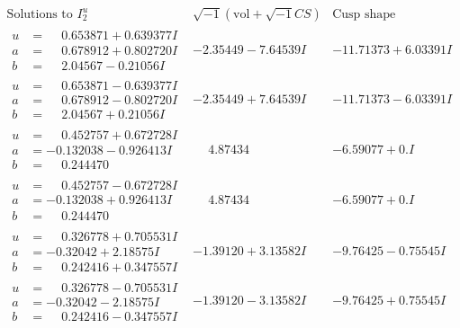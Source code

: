 \documentclass[1p]{elsarticle_modified}
\theoremstyle{definition}
\newcommand{\I}{\sqrt{-1}}
\begin{document}
$$\begin{array}{c|c|c}  
\text{Solutions to }I^u_{2}& \I (\text{vol} + \sqrt{-1}CS) & \text{Cusp shape}\\
 \hline 
\begin{aligned}
u &= \phantom{-}0.653871 + 0.639377 I \\
a &= \phantom{-}0.678912 + 0.802720 I \\
b &= \phantom{-}2.04567 - 0.21056 I\end{aligned}
 & -2.35449 - 7.64539 I & -11.71373 + 6.03391 I \\ \hline\begin{aligned}
u &= \phantom{-}0.653871 - 0.639377 I \\
a &= \phantom{-}0.678912 - 0.802720 I \\
b &= \phantom{-}2.04567 + 0.21056 I\end{aligned}
 & -2.35449 + 7.64539 I & -11.71373 - 6.03391 I \\ \hline\begin{aligned}
u &= \phantom{-}0.452757 + 0.672728 I \\
a &= -0.132038 - 0.926413 I \\
b &= \phantom{-}0.244470\phantom{ +0.000000I}\end{aligned}
 & \phantom{-}4.87434\phantom{ +0.000000I} & -6.59077 + 0. I\phantom{ +0.000000I} \\ \hline\begin{aligned}
u &= \phantom{-}0.452757 - 0.672728 I \\
a &= -0.132038 + 0.926413 I \\
b &= \phantom{-}0.244470\phantom{ +0.000000I}\end{aligned}
 & \phantom{-}4.87434\phantom{ +0.000000I} & -6.59077 + 0. I\phantom{ +0.000000I} \\ \hline\begin{aligned}
u &= \phantom{-}0.326778 + 0.705531 I \\
a &= -0.32042 + 2.18575 I \\
b &= \phantom{-}0.242416 + 0.347557 I\end{aligned}
 & -1.39120 + 3.13582 I & -9.76425 - 0.75545 I \\ \hline\begin{aligned}
u &= \phantom{-}0.326778 - 0.705531 I \\
a &= -0.32042 - 2.18575 I \\
b &= \phantom{-}0.242416 - 0.347557 I\end{aligned}
 & -1.39120 - 3.13582 I & -9.76425 + 0.75545 I \\ \hline\begin{aligned}

\end{aligned}
\end{array}$$
\end{document}
